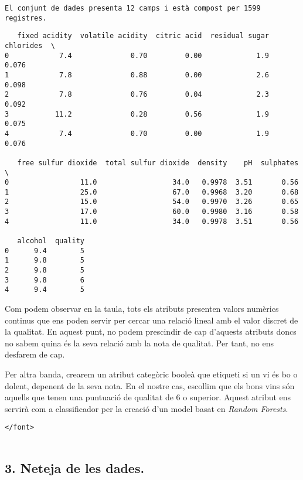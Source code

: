 \documentclass[11pt]{article}
\begin{document}
    \begin{Verbatim}[commandchars=\\\{\}]
El conjunt de dades presenta 12 camps i està compost per 1599 registres.

    \end{Verbatim}

    
    \begin{verbatim}
   fixed acidity  volatile acidity  citric acid  residual sugar  chlorides  \
0            7.4              0.70         0.00             1.9      0.076   
1            7.8              0.88         0.00             2.6      0.098   
2            7.8              0.76         0.04             2.3      0.092   
3           11.2              0.28         0.56             1.9      0.075   
4            7.4              0.70         0.00             1.9      0.076   

   free sulfur dioxide  total sulfur dioxide  density    pH  sulphates  \
0                 11.0                  34.0   0.9978  3.51       0.56   
1                 25.0                  67.0   0.9968  3.20       0.68   
2                 15.0                  54.0   0.9970  3.26       0.65   
3                 17.0                  60.0   0.9980  3.16       0.58   
4                 11.0                  34.0   0.9978  3.51       0.56   

   alcohol  quality  
0      9.4        5  
1      9.8        5  
2      9.8        5  
3      9.8        6  
4      9.4        5  
    \end{verbatim}

    
    Com podem observar en la taula, tots els atributs presenten valors
numèrics continus que ens poden servir per cercar una relació lineal amb
el valor discret de la qualitat. En aquest punt, no podem prescindir de
cap d'aquests atributs doncs no sabem quina és la seva relació amb la
nota de qualitat. Per tant, no ens desfarem de cap.

Per altra banda, crearem un atribut categòric booleà que etiqueti si un
vi és bo o dolent, depenent de la seva nota. En el nostre cas, escollim
que els bons vins són aquells que tenen una puntuació de qualitat de 6 o
superior. Aquest atribut ens servirà com a classificador per la creació
d'un model basat en \emph{Random Forests}.

\begin{verbatim}
</font>
    
\end{verbatim}

    \hypertarget{neteja-de-les-dades.}{%
\subsection{3. Neteja de les dades.}\label{neteja-de-les-dades.}}
\end{document}

